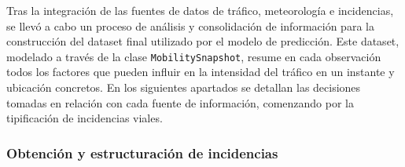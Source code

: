 Tras la integración de las fuentes de datos de tráfico, meteorología e incidencias, se llevó a cabo un proceso de análisis y consolidación de información para la construcción del dataset final utilizado por el modelo de predicción. Este dataset, modelado a través de la clase \texttt{MobilitySnapshot}, resume en cada observación todos los factores que pueden influir en la intensidad del tráfico en un instante y ubicación concretos. En los siguientes apartados se detallan las decisiones tomadas en relación con cada fuente de información, comenzando por la tipificación de incidencias viales.

\subsubsection{Obtención y estructuración de incidencias}

